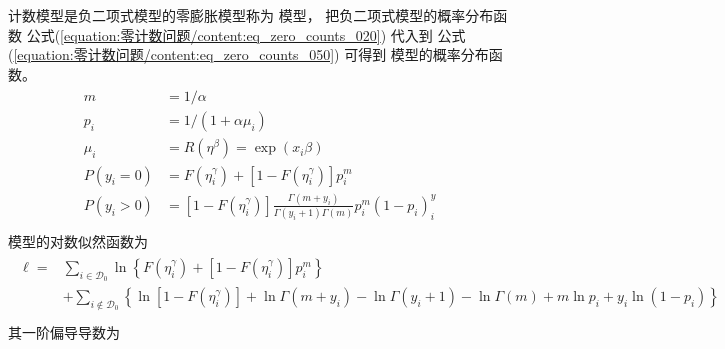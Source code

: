 \documentclass[letterpaper,10pt,english]{sphinxmanual}
\begin{document}

计数模型是负二项式模型的零膨胀模型称为  模型，
把负二项式模型的概率分布函数 公式(\ref{equation:零计数问题/content:eq_zero_counts_020})
代入到 公式(\ref{equation:零计数问题/content:eq_zero_counts_050})
可得到  模型的概率分布函数。
\begin{align}\label{equation:零计数问题/content:零计数问题/content:4}\!\begin{aligned}
m &= 1/\alpha\\
p_i &= 1/(1+\alpha \mu_i)\\
\mu_i &= R(\eta^{\beta}) = \exp(x_i \beta)\\
P(y_i=0) &= F(\eta^{\gamma}_i)  + [ 1- F(\eta^{\gamma}_i) ] p_i^m\\
P(y_i>0) &= [ 1- F(\eta^{\gamma}_i) ] \frac{\Gamma(m+y_i)}{\Gamma(y_i+1)\Gamma(m)}p_i^m(1-p_i)^y_i\\
\end{aligned}\end{align}
 模型的对数似然函数为
\begin{align}\label{equation:零计数问题/content:零计数问题/content:5}\!\begin{aligned}
\ell = &\sum_{ i \in \mathcal{D}_0 } \ln \left \{ F(\eta^{\gamma}_i)  + [ 1- F(\eta^{\gamma}_i) ] p_i^m  \right \}\\
&+ \sum_{ i \notin \mathcal{D}_0 }
\left \{ \ln [ 1- F(\eta^{\gamma}_i) ]
+ \ln \Gamma(m+y_i)
-  \ln \Gamma(y_i+1)
- \ln \Gamma(m)
+m \ln p_i
+ y_i \ln(1-p_i)
\right \}\\
\end{aligned}\end{align}
其一阶偏导导数为
\end{document}
